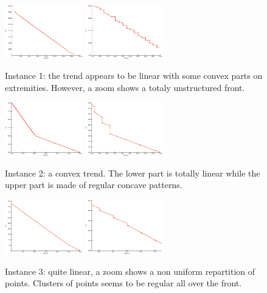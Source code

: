 \documentclass{llncs}
\begin{document}
\begin{figure}[h!]
  \centering
      \includegraphics[width=0.30\textwidth]{1}
      \includegraphics[width=0.30\textwidth]{1_zoom}
 \caption{\label{instance1} Instance 1: the trend appears to be linear with some convex parts on extremities. However, a zoom shows a totaly unstructured front.}
\end{figure}
\begin{figure}[h!]
  \centering
      \includegraphics[width=0.30\textwidth]{4}
      \includegraphics[width=0.30\textwidth]{4_zoom}
 \caption{\label{instance2} Instance 2: a convex trend. The lower part is totally linear while the upper part is made of regular concave patterns.}
\end{figure}
\begin{figure}[h!]
  \centering
      \includegraphics[width=0.30\textwidth]{9}
      \includegraphics[width=0.30\textwidth]{9_zoom}
 \caption{\label{instance6} Instance 3: quite linear, a zoom shows a non uniform repartition of points. Clusters of points seems to be regular all over the front.}
\end{figure}
\end{document}
